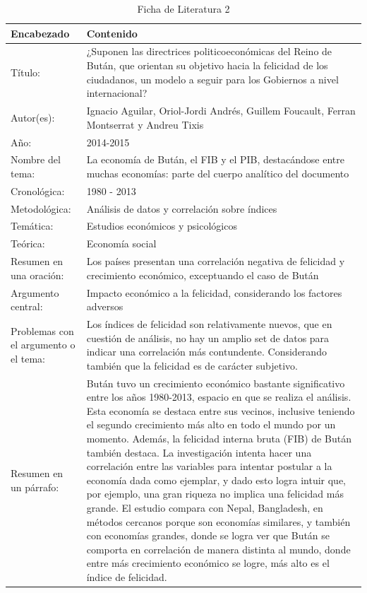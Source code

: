 \documentclass[12pt,oneside,letterpaper,spanish]{article}
\begin{document}
\begin{table}[htbp]
    \caption{Ficha de Literatura 2}
    \begin{center}
        \begin{tabular}{  m{3cm} | m{12cm}  }
        \hline\textbf{ Encabezado} & \textbf{Contenido }\\ \hline
        Título: & ¿Suponen las directrices politicoeconómicas del Reino de Bután, que orientan su objetivo hacia la felicidad de los ciudadanos, un modelo a seguir para los Gobiernos a nivel internacional? \\ \hline
        Autor(es): &  Ignacio Aguilar, Oriol-Jordi Andrés, Guillem Foucault, Ferran Montserrat y Andreu Tixis\\ \hline
        Año: & 2014-2015 \\ \hline
        Nombre del tema: & La economía de Bután, el FIB y el PIB, destacándose entre muchas economías: parte del cuerpo analítico del documento \\ \hline
        Cronológica: & 1980 - 2013 \\ \hline
        Metodológica: & Análisis de datos y correlación sobre índices \\ \hline
        Temática: & Estudios económicos y psicológicos \\ \hline
        Teórica: & Economía social \\ \hline
        Resumen en una oración: & Los países presentan una correlación negativa de felicidad y crecimiento económico, exceptuando el caso de Bután \\ \hline
        Argumento central: & Impacto económico a la felicidad, considerando los factores adversos \\ \hline
        Problemas con el argumento o el tema: & Los índices de felicidad son relativamente nuevos, que en cuestión de análisis, no hay un amplio set de datos para indicar una correlación más contundente. Considerando también que la felicidad es de carácter subjetivo.  \\ \hline
            Resumen en un párrafo: & Bután tuvo un crecimiento económico bastante significativo entre los años 1980-2013, espacio en que se realiza el análisis. Esta economía se destaca entre sus vecinos, inclusive teniendo el segundo crecimiento más alto en todo el mundo por un momento. Además, la felicidad interna bruta (FIB) de Bután también destaca. La investigación intenta hacer una correlación entre las variables para intentar postular a la economía dada como ejemplar, y dado esto logra intuir que, por ejemplo, una gran riqueza no implica una felicidad más grande. El estudio compara con Nepal, Bangladesh, en métodos cercanos porque son economías similares, y también con economías grandes, donde se logra ver que Bután se comporta en correlación de manera distinta al mundo, donde entre más crecimiento económico se logre, más alto es el índice de felicidad.   \\ \hline
        \end{tabular}
    \end{center}
\end{table}
\end{document}
